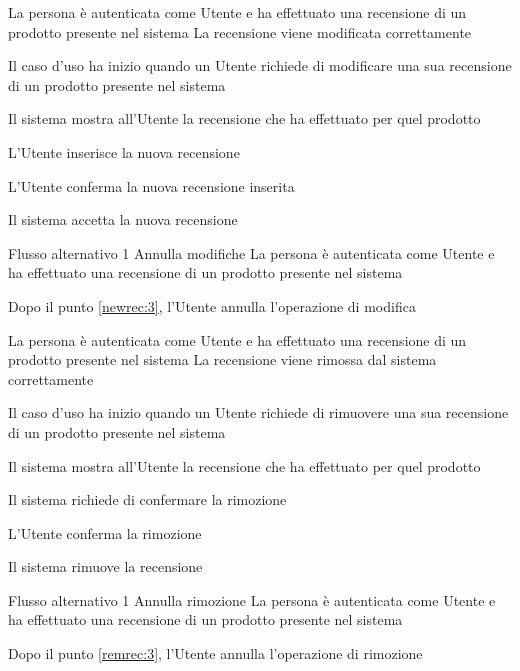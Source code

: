 \tabcuvspace

{}
{La persona è autenticata come Utente e ha effettuato una recensione di un prodotto presente nel sistema}
{La recensione viene modificata correttamente}
{\begin{enumCU}
	\item Il caso d'uso ha inizio quando un Utente richiede di modificare una sua recensione di un prodotto presente nel sistema
	\item Il sistema mostra all'Utente la recensione che ha effettuato per quel prodotto
	\item L'Utente inserisce la nuova recensione \label{newrec:3}
	\item L'Utente conferma la nuova recensione inserita
	\item Il sistema accetta la nuova recensione
\end{enumCU}}
%
{Flusso alternativo 1}%
{Annulla modifiche}%
{La persona è autenticata come Utente e ha effettuato una recensione di un prodotto presente nel sistema}
{\postNulle}%
{\begin{enumCU}
		\item Dopo il punto \ref{newrec:3}, l'Utente annulla l'operazione di modifica
	\end{enumCU}}%

\tabcuvspace

{}
{La persona è autenticata come Utente e ha effettuato una recensione di un prodotto presente nel sistema}
{La recensione viene rimossa dal sistema correttamente }
{\begin{enumCU}
	\item Il caso d'uso ha inizio quando un Utente richiede di rimuovere una sua recensione di un prodotto presente nel sistema
	\item Il sistema mostra all'Utente la recensione che ha effettuato per quel prodotto
	\item Il sistema richiede di confermare la rimozione \label{remrec:3}
	\item L'Utente conferma la rimozione
	\item Il sistema rimuove la recensione
\end{enumCU}}
%
{Flusso alternativo 1}%
{Annulla rimozione}%
{La persona è autenticata come Utente e ha effettuato una recensione di un prodotto presente nel sistema}
{\postNulle}%
{\begin{enumCU}
		\item Dopo il punto \ref{remrec:3}, l'Utente annulla l'operazione di rimozione
	\end{enumCU}}%

